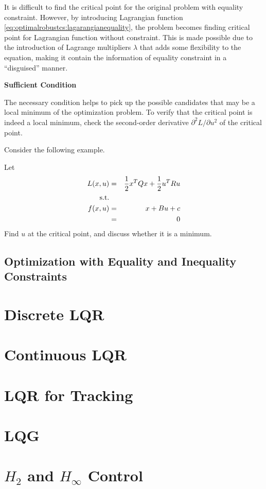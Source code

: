 It is difficult to find the critical point for the original problem with equality constraint. However, by introducing Lagrangian function \eqref{eq:optimalrobustcs:lagarangianequality}, the problem becomes finding critical point for Lagrangian function without constraint. This is made possible due to the introduction of Lagrange multipliers $\lambda$ that adds some flexibility to the equation, making it contain the information of equality constraint in a ``disguised'' manner.

\vspace{0.1in}
\noindent \textbf{Sufficient Condition}
\vspace{0.1in}

The necessary condition helps to pick up the possible candidates that may be a local minimum of the optimization problem. To verify that the critical point is indeed a local minimum, check the second-order derivative $\partial^2 L / \partial u^2$ of the critical point.

Consider the following example.
\begin{shortbox}

Let
\begin{eqnarray}
	L(x, u) &=& \dfrac{1}{2}x^TQx + \dfrac{1}{2}u^TRu \nonumber \\
	\textup{s.t.} \nonumber \\ f(x, u) &=& x + Bu + c \nonumber \\ &=& 0 \nonumber
\end{eqnarray}
Find $u$ at the critical point, and discuss whether it is a minimum.

\end{shortbox}






\subsection{Optimization with Equality and Inequality Constraints}

\section{Discrete LQR}

\section{Continuous LQR}

\section{LQR for Tracking}

\section{LQG}

\section{$H_2$ and $H_\infty$ Control} 
